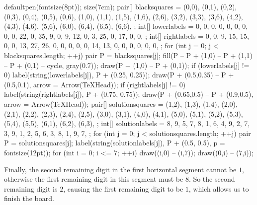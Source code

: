 	\begin{center}
		\begin{asy}
			defaultpen(fontsize(8pt));
			size(7cm);
			pair[] blacksquares = {
				(0,0), (0,1), (0,2), (0,3), (0,4), (0,5), (0,6),
				(1,0), (1,1), (1,5), (1,6),
				(2,6),
				(3,2), (3,3), (3,6),
				(4,2), (4,3), (4,6),
				(5,6),
				(6,0), (6,4), (6,5), (6,6),
			};
			int[] lowerlabels = {
				0, 0, 0, 0, 0, 0, 0,
				0, 0, 22, 0,
				35,
				9, 0, 9,
				12, 0, 3,
				25,
				0, 17, 0, 0,
			};
			int[] rightlabels = {
				0, 0, 9, 15, 15, 0, 0,
				13, 27, 26, 0,
				0,
				0, 0, 0,
				14, 13, 0,
				0,
				0, 0, 0, 0,
			};
			for (int j = 0; j < blacksquares.length; ++j) {
				pair P = blacksquares[j];
				fill(P -- P + (1,0) -- P + (1,1) -- P + (0,1) -- cycle, gray(0.7));
				draw(P + (1,0) -- P + (0,1));
				if (lowerlabels[j] != 0) {
					label(string(lowerlabels[j]), P + (0.25, 0.25));
					draw(P + (0.5,0.35) -- P + (0.5,0.1), arrow = Arrow(TeXHead));
				}
				if (rightlabels[j] != 0) {
					label(string(rightlabels[j]), P + (0.75, 0.75));
					draw(P + (0.65,0.5) -- P + (0.9,0.5), arrow = Arrow(TeXHead));
				}
			}
			pair[] solutionsquares = {
				(1,2), (1,3), (1,4),
				(2,0), (2,1), (2,2), (2,3), (2,4), (2,5),
				(3,0), (3,1),
				(4,0), (4,1),
				(5,0), (5,1), (5,2), (5,3), (5,4), (5,5),
				(6,1), (6,2), (6,3),
			};
			int[] solutionlabels = {
				8, 9, 5,
				7, 8, 1, 6, 4, 9,
				2, 7,
				3, 9,
				1, 2, 5, 6, 3, 8,
				1, 9, 7,
			};
			for (int j = 0; j < solutionsquares.length; ++j) {
				pair P = solutionsquares[j];
				label(string(solutionlabels[j]), P + (0.5, 0.5), p = fontsize(12pt));
			}
			for (int i = 0; i <= 7; ++i) {
				draw((i,0) -- (i,7));
				draw((0,i) -- (7,i));
			}
		\end{asy}
	\end{center}
	Finally, the second remaining digit in the first horizontal segment cannot be $1$, otherwise the first remaining digit in this segment must be $8$. So the second remaining digit is $2$, causing the first remaining digit to be $1$, which allows us to finish the board.
	